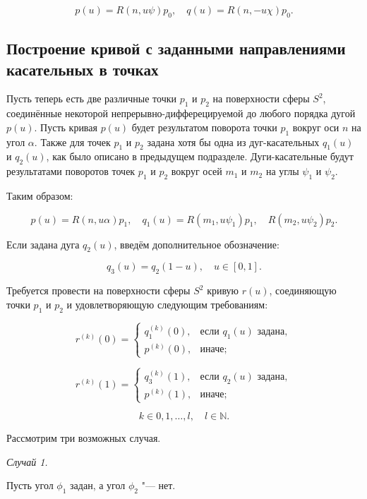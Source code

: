 $$
p(u)=R(n,u\psi)p_0, \quad q(u)=R(n,-u\chi)p_0.
$$

\subsection*{Построение кривой с заданными направлениями \mbox{касательных} в точках}

Пусть теперь есть две различные точки $p_1$ и $p_2$ на поверхности сферы $S^2$, соединённые некоторой
непрерывно-дифферецируемой до любого порядка дугой $p(u)$. Пусть кривая $p(u)$ будет результатом поворота точки $p_1$
вокруг оси $n$ на угол $\alpha$. Также для точек $p_1$ и $p_2$ задана хотя бы одна из дуг-касательных $q_1(u)$
и $q_2(u)$, как было описано в предыдущем подразделе. Дуги-касательные будут результатами поворотов точек $p_1$ и $p_2$
вокруг осей $m_1$ и $m_2$ на углы $\psi_1$ и $\psi_2$.

Таким образом:

$$
p(u)=R(n,u\alpha)p_1, \quad q_1(u)=R(m_1,u\psi_1)p_1, \quad R(m_2,u\psi_2)p_2.
$$

Если задана дуга $q_2(u)$, введём дополнительное обозначение:

$$
q_3(u)=q_2(1-u), \quad u \in [0,1].
$$

Требуется провести на поверхности сферы $S^2$ кривую $r(u)$, соединяющую точки $p_1$ и $p_2$ и удовлетворяющую
следующим требованиям:

\begin{equation*}
r^{(k)}(0)=
  \begin{cases}
    q_1^{(k)}(0), & \text{если $q_1(u)$ задана}, \\
    p^{(k)}(0),   & \text{иначе};
  \end{cases}
\end{equation*}

\begin{equation*}
r^{(k)}(1)=
  \begin{cases}
    q_3^{(k)}(1), & \text{если $q_2(u)$ задана}, \\
    p^{(k)}(1),   & \text{иначе};
  \end{cases}
\end{equation*}

$$
k \in {0,1,\dots,l}, \quad l \in \mathbb{N}.
$$

Рассмотрим три возможных случая.

\bigskip
\textit{Случай 1.}

Пусть угол $\phi_1$ задан, а угол $\phi_2$ "--- нет.


